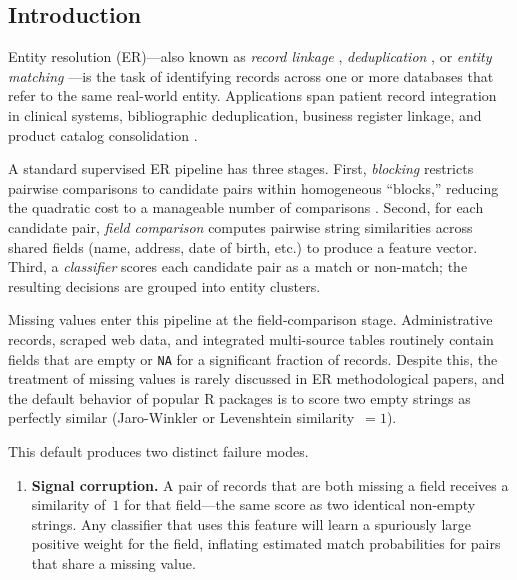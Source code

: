 \documentclass[a4paper]{article}
\begin{document}
\begin{article}
\section{Introduction}

Entity resolution (ER)---also known as \emph{record linkage}
\citep{Newcombe1959}, \emph{deduplication} \citep{Christen2012}, or
\emph{entity matching} \citep{Mudgal2018}---is the task of identifying
records across one or more databases that refer to the same real-world
entity. Applications span patient record integration in clinical
systems, bibliographic deduplication, business register linkage, and
product catalog consolidation \citep{Christophides2020}.

A standard supervised ER pipeline has three stages.  First,
\emph{blocking} restricts pairwise comparisons to candidate pairs within
homogeneous ``blocks,'' reducing the quadratic cost to a manageable
number of comparisons \citep{Christen2012}.  Second, for each candidate
pair, \emph{field comparison} computes pairwise string similarities
across shared fields (name, address, date of birth, etc.) to produce a
feature vector.  Third, a \emph{classifier} scores each candidate pair
as a match or non-match; the resulting decisions are grouped into
entity clusters.

Missing values enter this pipeline at the field-comparison stage.
Administrative records, scraped web data, and integrated
multi-source tables routinely contain fields that are empty or
\texttt{NA} for a significant fraction of records.  Despite this, the
treatment of missing values is rarely discussed in ER methodological
papers, and the default behavior of popular R packages is to score two
empty strings as perfectly similar (Jaro-Winkler or Levenshtein
similarity~$= 1$).

This default produces two distinct failure modes.

\begin{enumerate}
  \item \textbf{Signal corruption.} A pair of records that are both
    missing a field receives a similarity of~$1$ for that field---the
    same score as two identical non-empty strings. Any classifier that
    uses this feature will learn a spuriously large positive weight for
    the field, inflating estimated match probabilities for pairs that
    share a missing value.


\end{enumerate}
\end{article}
\end{document}
